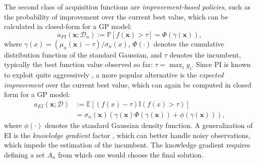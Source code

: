 \documentclass[10pt,letterpaper]{article} %
\begin{document}
The second class of acquisition functions are \emph{improvement-based policies}, such as the probability of improvement \citep[PI,][]{kushner_new_1964} over the current best value, which can be calculated in closed-form for a GP model:
$$a_{PI}(\mathbf{x}; \mathcal{D}_n) := \mathbb{P}[f(\mathbf{x}) > \tau] = \Phi(\gamma(\mathbf{x})),$$
where $\gamma(x) = (\mu_n(\mathbf{x}) - \tau) / \sigma_n(x)$, $\Phi(\cdot)$ denotes the cumulative distribution function of the
standard Gaussian, and $\tau$ denotes the incumbent, typically the best function value observed so far: $\tau = \max_i y_i$.
Since PI is known to exploit quite aggressively \cite{jones_taxonomy_2001}, a more popular
alternative is the \emph{expected improvement} \citep[EI,][]{mockus_application_1978} over the
current best value, which can again be computed in closed form for a GP model:
\begin{equation*}
\begin{split}
 a_{EI}(\mathbf{x}; \mathcal{D})
  & := \mathbb{E}[(f(x) - \tau)\mathbb{I}(f(x) > \tau)] \\
  &  = \sigma_n(\mathbf{x})\left(\gamma(\mathbf{x})\Phi(\gamma(\mathbf{x})) + \phi(\gamma(\mathbf{x}))\right),
\end{split}
\end{equation*}
where $\phi(\cdot)$ denotes the standard Gaussian density function.  A
generalization of EI is the \emph{knowledge gradient} factor \cite
{frazier_knowledge-gradient_2009}, which can better handle noisy observations,
which impede the estimation of the incumbent. The knowledge gradient requires
defining a set $A_n$ from which one would choose the final solution.
\end{document}
